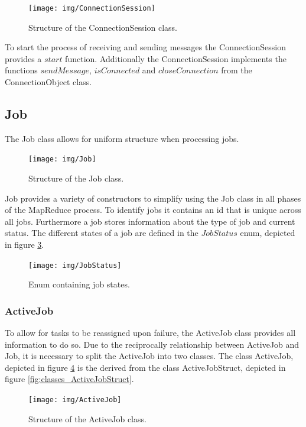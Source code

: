 \documentclass[12pt, letterpaper]{article}
\begin{document}
\begin{figure}[h]
	\centering
	\texttt{[image: img/ConnectionSession]}
	\caption{Structure of the ConnectionSession class.}
	\label{fig:classes_ConnectionSession}
\end{figure}

To start the process of receiving and sending messages the ConnectionSession provides a $start$ function. Additionally the ConnectionSession implements the functions $sendMessage$, $isConnected$ and $closeConnection$ from the ConnectionObject class.  

\pagebreak
\subsection{Job}

The Job class allows for uniform structure when processing jobs.

\begin{figure}[h]
	\centering
	\texttt{[image: img/Job]}
	\caption{Structure of the Job class.}
	\label{fig:classes_Job}
\end{figure}

Job provides a variety of constructors to simplify using the Job class in all phases of the MapReduce process. To identify jobs it contains an id that is unique across all jobs. Furthermore a job stores information about the type of job and current status. The different states of a job are defined in the $JobStatus$ enum, depicted in figure \ref{fig:classes_JobStatus}.

\begin{figure}[h]
	\centering
	\texttt{[image: img/JobStatus]}
	\caption{Enum containing job states.}
	\label{fig:classes_JobStatus}
\end{figure}

\subsubsection{ActiveJob}

To allow for tasks to be reassigned upon failure, the ActiveJob class provides all information to do so.
Due to the reciprocally relationship between ActiveJob and Job, it is necessary to split the ActiveJob into two classes. The class ActiveJob, depicted in figure \ref{fig:classes_ActiveJob} is the derived from the class ActiveJobStruct, depicted in figure \ref{fig:classes_ActiveJobStruct}.

\begin{figure}[h]
	\centering
	\texttt{[image: img/ActiveJob]}
	\caption{Structure of the ActiveJob class.}
	\label{fig:classes_ActiveJob}
\end{figure}
\end{document}
